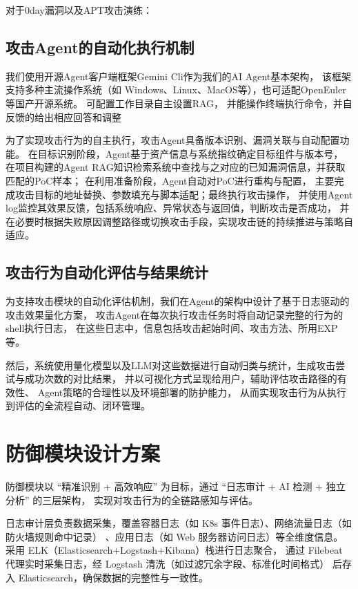 \documentclass[lang=cn,10pt]{elegantbook}
\begin{document}
对于0day漏洞以及APT攻击演练：

\subsection{攻击Agent的自动化执行机制}
我们使用开源Agent客户端框架Gemini Cli作为我们的AI Agent基本架构，
该框架支持多种主流操作系统（如 Windows、Linux、MacOS等），也可适配OpenEuler等国产开源系统。
可配置工作目录自主设置RAG，
并能操作终端执行命令，并自反馈的给出相应回答和调整

为了实现攻击行为的自主执行，攻击Agent具备版本识别、漏洞关联与自动配置功能。
在目标识别阶段，Agent基于资产信息与系统指纹确定目标组件与版本号，
在项目构建的Agent RAG知识检索系统中查找与之对应的已知漏洞信息，并获取匹配的PoC样本；
在利用准备阶段，Agent自动对PoC进行重构与配置，
主要完成攻击目标的地址替换、参数填充与脚本适配；最终执行攻击操作，
并使用Agent log监控其效果反馈，包括系统响应、异常状态与返回值，判断攻击是否成功，
并在必要时根据失败原因调整路径或切换攻击手段，实现攻击链的持续推进与策略自适应。

\subsection{攻击行为自动化评估与结果统计}

为支持攻击模块的自动化评估机制，我们在Agent的架构中设计了基于日志驱动的攻击效果量化方案，
攻击Agent在每次执行攻击任务时将自动记录完整的行为的shell执行日志，
在这些日志中，信息包括攻击起始时间、攻击方法、所用EXP等。

然后，系统使用量化模型以及LLM对这些数据进行自动归类与统计，生成攻击尝试与成功次数的对比结果，
并以可视化方式呈现给用户，辅助评估攻击路径的有效性、
Agent策略的合理性以及环境部署的防护能力，
从而实现攻击行为从执行到评估的全流程自动、闭环管理。


\section{防御模块设计方案}
防御模块以 “精准识别 + 高效响应” 为目标，通过 “日志审计 + AI 检测 + 独立分析” 的三层架构，
实现对攻击行为的全链路感知与评估。

日志审计层负责数据采集，覆盖容器日志（如 K8s 事件日志）、网络流量日志（如防火墙规则命中记录）
、应用日志（如 Web 服务器访问日志）等全维度信息。
采用 ELK（Elasticsearch+Logstash+Kibana）栈进行日志聚合，
通过 Filebeat 代理实时采集日志，经 Logstash 清洗（如过滤冗余字段、标准化时间格式）
后存入 Elasticsearch，确保数据的完整性与一致性。
\end{document}
